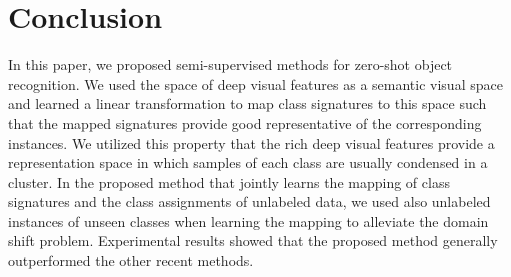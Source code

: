 \documentclass[10pt,twocolumn,letterpaper]{article}
\begin{document}

\section{Conclusion} \label{conclusion}
In this paper, we proposed semi-supervised methods for zero-shot object recognition. We used the space of deep visual features as a semantic visual space and learned a linear transformation to map class signatures to this space such that the mapped signatures provide good representative of the corresponding instances. We utilized this property that the rich deep visual features provide a representation space in which samples of each class are usually condensed in a cluster. In the proposed method that jointly learns the mapping of class signatures and the class assignments of unlabeled data, we used also unlabeled instances of unseen classes when learning the mapping to alleviate the domain shift problem. Experimental results showed that the proposed method generally outperformed the other recent methods.
{\small


}
\end{document}
